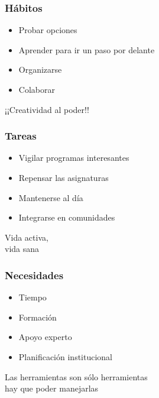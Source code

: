 \documentclass[17pt,aspectratio=169]{beamer}
\begin{document}

\begin{frame}
\frametitle{Hábitos}

\begin{itemize}
\item Probar opciones
\item Aprender para ir un paso por delante
\item Organizarse
\item Colaborar
\end{itemize}

\begin{flushright}
  ¡¡Creatividad al poder!!
\end{flushright}
\end{frame}


\begin{frame}
\frametitle{Tareas}

\begin{itemize}
\item Vigilar programas interesantes
\item Repensar las asignaturas
\item Mantenerse al día
\item Integrarse en comunidades
\end{itemize}

\begin{flushright}
  Vida activa, \\
  vida sana \\
\end{flushright}
\end{frame}


\begin{frame}
\frametitle{Necesidades}

\begin{itemize}
\item Tiempo
\item Formación
\item Apoyo experto
\item Planificación institucional
\end{itemize}

\begin{flushright}
  Las herramientas son sólo herramientas \\
  hay que poder manejarlas \\
\end{flushright}
\end{frame}
\end{document}
